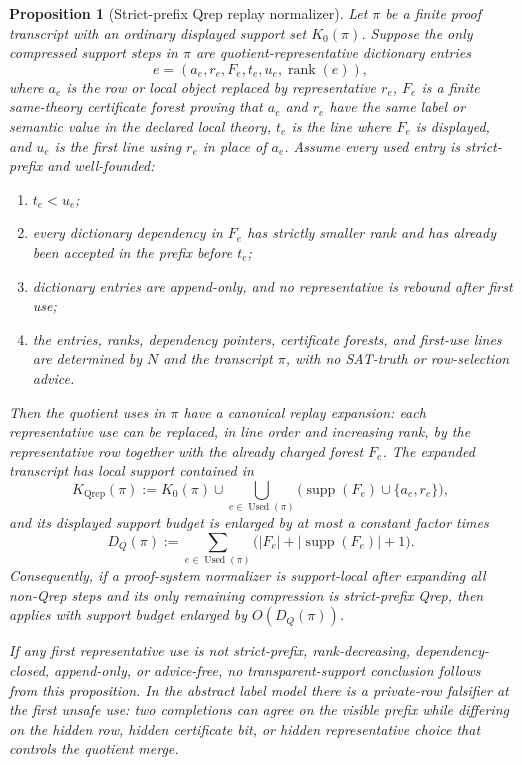 \documentclass[11pt]{article}
\newtheorem{proposition}[theorem]{Proposition}
\theoremstyle{definition}
\begin{document}
\begin{proposition}[Strict-prefix Qrep replay normalizer]\label{prop:strict-prefix-qrep}
Let \(\pi\) be a finite proof transcript with an ordinary displayed support set \(K_0(\pi)\).  Suppose the only compressed support steps in \(\pi\) are quotient-representative dictionary entries
\[
  e=(a_e,r_e,F_e,t_e,u_e,\operatorname{rank}(e)),
\]
where \(a_e\) is the row or local object replaced by representative \(r_e\), \(F_e\) is a finite same-theory certificate forest proving that \(a_e\) and \(r_e\) have the same label or semantic value in the declared local theory, \(t_e\) is the line where \(F_e\) is displayed, and \(u_e\) is the first line using \(r_e\) in place of \(a_e\).  Assume every used entry is strict-prefix and well-founded:
\begin{enumerate}
  \item \(t_e<u_e\);
  \item every dictionary dependency in \(F_e\) has strictly smaller rank and has already been accepted in the prefix before \(t_e\);
  \item dictionary entries are append-only, and no representative is rebound after first use;
  \item the entries, ranks, dependency pointers, certificate forests, and first-use lines are determined by \(N\) and the transcript \(\pi\), with no SAT-truth or row-selection advice.
\end{enumerate}
Then the quotient uses in \(\pi\) have a canonical replay expansion: each representative use can be replaced, in line order and increasing rank, by the representative row together with the already charged forest \(F_e\).  The expanded transcript has local support contained in
\[
  K_{\mathrm{Qrep}}(\pi)
    :=K_0(\pi)\cup
      \bigcup_{e\in\operatorname{Used}(\pi)}
        \bigl(\operatorname{supp}(F_e)\cup\{a_e,r_e\}\bigr),
\]
and its displayed support budget is enlarged by at most a constant factor times
\[
  D_Q(\pi)
    :=\sum_{e\in\operatorname{Used}(\pi)}
       \bigl(|F_e|+|\operatorname{supp}(F_e)|+1\bigr).
\]
Consequently, if a proof-system normalizer is support-local after expanding all non-Qrep steps and its only remaining compression is strict-prefix Qrep, then  applies with support budget enlarged by \(O(D_Q(\pi))\).

If any first representative use is not strict-prefix, rank-decreasing, dependency-closed, append-only, or advice-free, no transparent-support conclusion follows from this proposition.  In the abstract label model there is a private-row falsifier at the first unsafe use: two completions can agree on the visible prefix while differing on the hidden row, hidden certificate bit, or hidden representative choice that controls the quotient merge.
\end{proposition}
\end{document}

